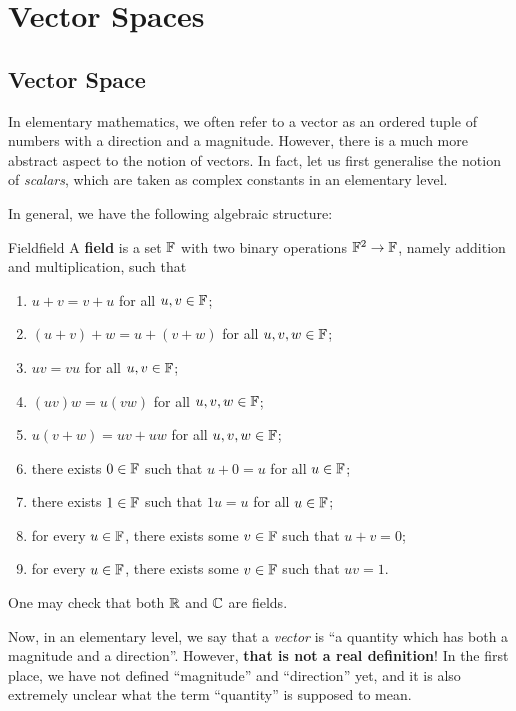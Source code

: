 \documentclass[math]{amznotes}
\theoremstyle{remark}
\begin{document}
\tableofcontents

\chapter{Vector Spaces}
\section{Vector Space}
In elementary mathematics, we often refer to a vector as an ordered tuple of numbers with a direction and a magnitude. However, there is a much more abstract aspect to the notion of vectors. In fact, let us first generalise the notion of \textit{scalars}, which are taken as complex constants in an elementary level. 

In general, we have the following algebraic structure:
\begin{dfnbox}{Field}{field}
    A {\color{red} \textbf{field}} is a set $\mathbb{F}$ with two binary operations $\mathbb{F}^2 \to \mathbb{F}$, namely addition and multiplication, such that
    \begin{enumerate}
        \item $u + v = v + u$ for all $u, v \in \mathbb{F}$;
        \item $(u + v) + w = u + (v + w)$ for all $u, v, w \in \mathbb{F}$;
        \item $uv = vu$ for all $u, v \in \mathbb{F}$;
        \item $(uv)w = u(vw)$ for all $u, v, w \in \mathbb{F}$;
        \item $u(v + w) = uv + uw$ for all $u, v, w \in \mathbb{F}$;
        \item there exists $0 \in \mathbb{F}$ such that $u + 0 = u$ for all $u \in \mathbb{F}$;
        \item there exists $1 \in \mathbb{F}$ such that $1u = u$ for all $u \in \mathbb{F}$;
        \item for every $u \in \mathbb{F}$, there exists some $v \in \mathbb{F}$ such that $u + v = 0$;
        \item for every $u \in \mathbb{F}$, there exists some $v \in \mathbb{F}$ such that $uv = 1$.
    \end{enumerate}
\end{dfnbox}
One may check that both $\mathbb{R}$ and $\mathbb{C}$ are fields. 

Now, in an elementary level, we say that a \textit{vector} is ``a quantity which has both a magnitude and a direction''. However, \textbf{that is not a real definition}! In the first place, we have not defined ``magnitude'' and ``direction'' yet, and it is also extremely unclear what the term ``quantity'' is supposed to mean. 
\end{document}
